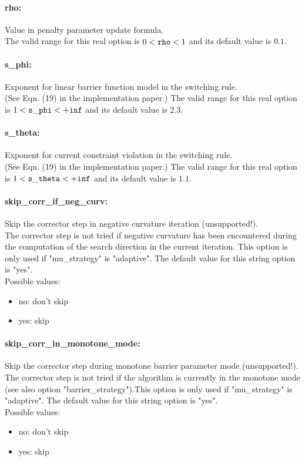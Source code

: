\paragraph{rho:}\label{sec:rho} Value in penalty parameter update formula. $\;$ \\
 The valid range for this real option is 
$0 <  {\tt rho } <  1$
and its default value is $0.1$.


\paragraph{s\_phi:}\label{sec:s_phi} Exponent for linear barrier function model in the switching rule. $\;$ \\
 (See Eqn. (19) in the implementation paper.) The valid range for this real option is 
$1 <  {\tt s\_phi } <  {\tt +inf}$
and its default value is $2.3$.


\paragraph{s\_theta:}\label{sec:s_theta} Exponent for current constraint violation in the switching rule. $\;$ \\
 (See Eqn. (19) in the implementation paper.) The valid range for this real option is 
$1 <  {\tt s\_theta } <  {\tt +inf}$
and its default value is $1.1$.


\paragraph{skip\_corr\_if\_neg\_curv:}\label{sec:skip_corr_if_neg_curv} Skip the corrector step in negative curvature iteration (unsupported!). $\;$ \\
 The corrector step is not tried if negative
curvature has been encountered during the
computation of the search direction in the
current iteration. This option is only used if
"mu\_strategy" is "adaptive".
The default value for this string option is "yes".
\\ 
Possible values:
\begin{itemize}
   \item no: don't skip
   \item yes: skip
\end{itemize}

\paragraph{skip\_corr\_in\_monotone\_mode:}\label{sec:skip_corr_in_monotone_mode} Skip the corrector step during monotone barrier parameter mode (unsupported!). $\;$ \\
 The corrector step is not tried if the algorithm
is currently in the monotone mode (see also
option "barrier\_strategy").This option is only
used if "mu\_strategy" is "adaptive".
The default value for this string option is "yes".
\\ 
Possible values:
\begin{itemize}
   \item no: don't skip
   \item yes: skip
\end{itemize}

